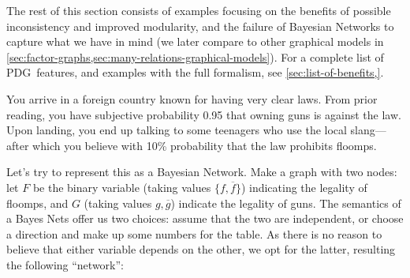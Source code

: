 \documentclass{article}
\newcommand{\MN}{PDG}
\begin{document}
	The rest of this section consists of examples focusing on the benefits of possible inconsistency and improved modularity, and the failure of Bayesian Networks to capture what we have in mind (we later compare to other graphical models in \cref{sec:factor-graphs,sec:many-relations-graphical-models}). For a complete list of \MN\ features, and examples with the full formalism, see \cref{sec:list-of-benefits,}.
	
	\begin{example}\label{ex:guns-and-floomps}
		You arrive in a foreign country known for having very clear laws. From prior reading, you have subjective probability 0.95 that owning guns is against the law. Upon landing, you end up talking to some teenagers who use the local slang---after which you believe with 10\% probability that the law prohibits floomps.
		
		Let's try to represent this as a Bayesian Network. Make a graph with two nodes: let $F$ be the binary variable (taking values $\{f, \overline f\}$) indicating the legality of floomps, and $G$ (taking values $g, \overline g$) indicate the legality of guns. 
		The semantics of a Bayes Nets offer us two choices: assume that the two are independent, or choose a direction and make up some numbers for the table.
		As there is no reason to believe that either variable depends on the other, we opt for the latter, resulting the following ``network'':	
		
		\begin{center}
		\end{center}
		

\end{example}
\end{document}

